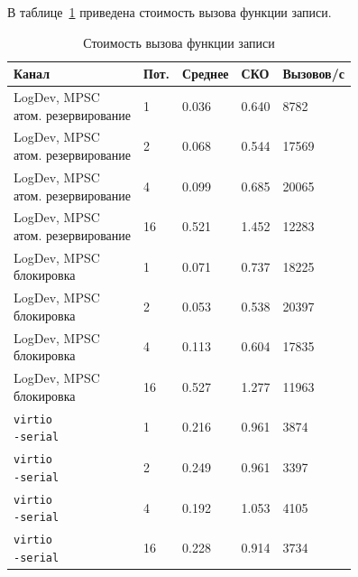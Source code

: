 В таблице~\ref{tab:write-call-cost} приведена стоимость вызова функции записи.

\begin{table}[H]
    \centering
    \caption{Стоимость вызова функции записи}
    \label{tab:write-call-cost}
    \small
    \setlength{\tabcolsep}{3pt}
    \begin{tabularx}{\textwidth}{|p{4.5cm}|p{1.2cm}|p{2cm}|p{2cm}|X|}
        \hline
        Канал & Пот. & Среднее & СКО & Вызовов/с \\
        \hline
        \makecell[l]{LogDev, MPSC\\атом. резервирование} & 1 & 0.036 & 0.640 & 8782 \\
        \hline
        \makecell[l]{LogDev, MPSC\\атом. резервирование} & 2 & 0.068 & 0.544 & 17569 \\
        \hline
        \makecell[l]{LogDev, MPSC\\атом. резервирование} & 4 & 0.099 & 0.685 & 20065 \\
        \hline
        \makecell[l]{LogDev, MPSC\\атом. резервирование} & 16 & 0.521 & 1.452 & 12283 \\
        \hline
        \makecell[l]{LogDev, MPSC\\блокировка} & 1 & 0.071 & 0.737 & 18225 \\
        \hline
        \makecell[l]{LogDev, MPSC\\блокировка} & 2 & 0.053 & 0.538 & 20397 \\
        \hline
        \makecell[l]{LogDev, MPSC\\блокировка} & 4 & 0.113 & 0.604 & 17835 \\
        \hline
        \makecell[l]{LogDev, MPSC\\блокировка} & 16 & 0.527 & 1.277 & 11963 \\
        \hline
        \makecell[l]{\texttt{virtio}\\\texttt{-serial}} & 1 & 0.216 & 0.961 & 3874 \\
        \hline
        \makecell[l]{\texttt{virtio}\\\texttt{-serial}} & 2 & 0.249 & 0.961 & 3397 \\
        \hline
        \makecell[l]{\texttt{virtio}\\\texttt{-serial}} & 4 & 0.192 & 1.053 & 4105 \\
        \hline
        \makecell[l]{\texttt{virtio}\\\texttt{-serial}} & 16 & 0.228 & 0.914 & 3734 \\
        \hline
    \end{tabularx}
\end{table}

